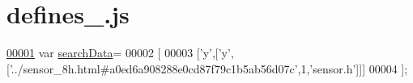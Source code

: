 \hypertarget{defines__13_8js_source}{}\section{defines\+\_.\+js}
\label{defines__13_8js_source}

\begin{DoxyCode}
\hypertarget{defines__13_8js_source.tex_l00001}{}\hyperlink{defines__13_8js_ad01a7523f103d6242ef9b0451861231e}{00001} var \hyperlink{defines__13_8js_ad01a7523f103d6242ef9b0451861231e}{searchData}=
00002 [
00003   [\textcolor{charliteral}{'y'},[\textcolor{charliteral}{'y'},[\textcolor{stringliteral}{'../sensor\_8h.html#a0ed6a908288e0cd87f79c1b5ab56d07c'},1,\textcolor{stringliteral}{'sensor.h'}]]]
00004 ];
\end{DoxyCode}
